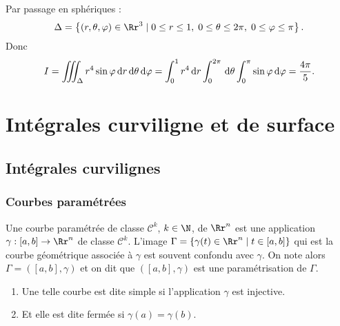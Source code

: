 \documentclass[class=report,crop=false]{standalone}
\begin{document}
\noindent Par passage en sphériques :
$$\Delta =\left\{(r,\theta ,\varphi)\in \Rr^3\mid 0\leq r\leq 1,\; 0\leq \theta \leq 2\pi,\; 0\leq \varphi \leq \pi\right\}.$$
Donc
$$I=\int \!\!\!\!\int \!\!\!\!\int _{\Delta}r^4\sin \varphi \d r\d \theta \d \varphi =\int _0^1r^4\d r\int _0^{2\pi}\d \theta\int _{0}^{\pi}\sin \varphi \d \varphi =\frac{4\pi}{5}.$$


\chapter{\bf Intégrales curviligne et de surface}
\section{Intégrales curvilignes}

\thispagestyle{empty}

\subsection{Courbes paramétrées}

\vskip4mm

\begin{definition}Une courbe paramétrée de classe $\mathscr{C}^k$, $k\in \N$, de $\Rr^n$ est une application $\gamma :[a,b]\to \Rr^n$ de classe $\mathscr{C}^k$. L'image $\Gamma =\{\gamma (t)\in \Rr^n\mid t\in [a,b]\}$ qui est la courbe géométrique associée à $\gamma $ est souvent confondu avec $\gamma $. On note alors $\Gamma =\left([a,b],\gamma\right)$ et on dit que $\left([a,b],\gamma\right)$ est une paramétrisation de $\Gamma$.
\begin{enumerate}
\item Une telle courbe est dite simple si l'application $\gamma$ est injective.
\item Et elle est dite fermée si $\gamma (a)=\gamma (b)$.
\end{enumerate}
\end{definition}

\vskip4mm
\end{document}
